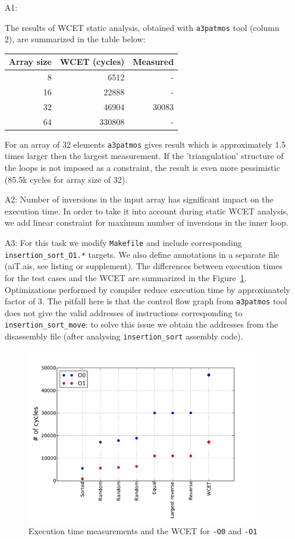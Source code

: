 \documentclass[12pt,a4paper,titlepage,oneside]{article}
\begin{document}
\begin{itemize}

\item[A1:]

The results of WCET static analysis, obtained with \texttt{a3patmos}
tool (column 2), are summarized in the table below:

\begin{tabular}{ | r | r | r |}
\hline
Array size & WCET (cycles) & Measured \\\hline
8  & 6512 & - \\\hline
16 & 22888 & - \\\hline
32 & 46904 & 30083 \\\hline
64 & 330808 & - \\\hline
\end{tabular}

For an array of 32 elements \texttt{a3patmos} gives result which is
approximately 1.5 times larger then the largest measurement. 
If the 'triangulation' structure of the loops is not
imposed as a constraint, the result is even more
pessimistic (85.5k cycles for array size of 32).

\item[A2:]
Number of inversions in the input array has significant impact on
the execution time. In order to take it into
account during static WCET analysis, we add linear
constraint for maximum number of inversions in the inner loop.

\item[A3:]
For this task we modify \texttt{Makefile} and include corresponding
\texttt{insertion\_sort\_O1.*} targets.
We also define annotations in a separate file (aiT.ais, see listing or supplement).
The differences between execution times for the test cases 
and the WCET are summarized in the Figure~\ref{fig:opt_compare}.
Optimizations performed by compiler  reduce execution
time by approximately factor of 3. The pitfall here is
that the control flow graph from \texttt{a3patmos} tool does not give 
the valid addresses of instructions corresponding to \texttt{insertion\_sort\_move}:
to solve this issue we obtain the addresses from the disassembly file
(after analysing \texttt{insertion\_sort} assembly code).


\begin{figure}%
  \centering
  \includegraphics[width=4in]{q2_3}
  \caption
  {Execution time measurements and the WCET for \texttt{-O0} and
  \texttt{-O1}}
	\label{fig:opt_compare}
\end{figure}



\end{itemize}
\end{document}
